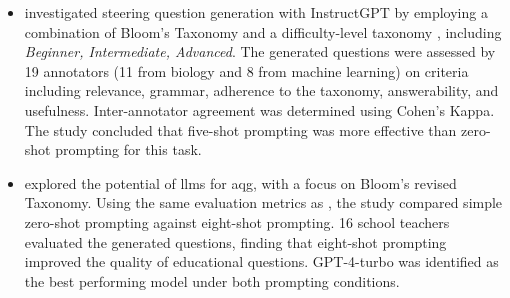 \begin{itemize}
    \item \cite{elkins_how_2023} investigated steering question generation with InstructGPT \cite{ouyang_training_2022} by employing a combination of Bloom's Taxonomy and a difficulty-level taxonomy \cite{perez_automatic_2012}, including \textit{Beginner, Intermediate, Advanced}. The generated questions were assessed by 19 annotators (11 from biology and 8 from machine learning) on criteria including relevance, grammar, adherence to the taxonomy, answerability, and usefulness. Inter-annotator agreement was determined using Cohen's Kappa. The study concluded that five-shot prompting was more effective than zero-shot prompting for this task.
    \item \cite{maity_can_2025} explored the potential of \ac{llms} for \ac{aqg}, with a focus on Bloom's revised Taxonomy. Using the same evaluation metrics as \cite{elkins_how_2023}, the study compared simple zero-shot prompting against eight-shot prompting. 16 school teachers evaluated the generated questions, finding that eight-shot prompting improved the quality of educational questions. GPT-4-turbo was identified as the best performing model under both prompting conditions. 

\end{itemize}
